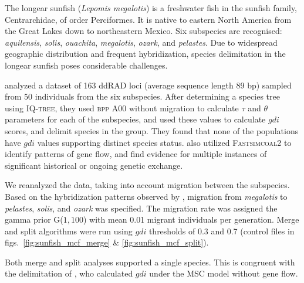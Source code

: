 \documentclass{article1}
\newcommand{\red}[1]{{\color{red}{#1}}}
\newcommand{\blue}[1]{{\color{blue}{#1}}}
\begin{document}
The longear sunfish (\textit{Lepomis megalotis}) is a freshwater fish in the sunfish
family, Centrarchidae, of order Perciformes.  It is native to eastern North America from
the Great Lakes down to northeastern Mexico.  Six subspecies are recognised:
\textit{aquilensis}, \textit{solis}, \textit{ouachita}, \textit{megalotis},
\textit{ozark}, and \textit{pelastes}.  Due to widespread geographic distribution and
frequent hybridization, species delimitation in the longear sunfish poses considerable
challenges.

\citet{Kim2022} analyzed a dataset of 163 ddRAD loci (average sequence length 89 bp)
sampled from 50 individuals from the six subspecies.  After determining a species tree
using \textsc{IQ-tree}, they used \textsc{bpp} A00 without migration to calculate $\tau$
and $\theta$ parameters for each of the subspecies, and used these values to calculate
$gdi$ scores, and delimit species in the group.  They found that none of the
populations have $gdi$ values supporting distinct species status. \citet{Kim2022}
also utilized \textsc{Fastsimcoal2} to identify patterns of gene flow, and find evidence
for multiple instances of significant historical or ongoing genetic exchange.

We reanalyzed the data, taking into account migration between the subspecies.  Based on
the hybridization patterns observed by \cite{Kim2022}, migration from \textit{megalotis}
to \textit{pelastes}, \textit{solis}, and \textit{ozark} was specified.  The migration
rate was assigned the gamma prior G($1,100$) with mean 0.01 migrant individuals per
generation.  Merge and split algorithms were run using $gdi$ thresholds of 0.3 and
0.7 (control files in figs.~\ref{fig:sunfish_mcf_merge} \& \ref{fig:sunfish_mcf_split}).

Both merge and split analyses supported a single species.  This is congruent with the
delimitation of \citet{Kim2022}, who calculated $gdi$ under the MSC model without
gene flow. \red{[look at parameter estimates.]} \blue{Throughout the merge run, which started from 6 species, the migration rates between populations were consistently large, indicating high rates of gene flow between the populations, and further supporting the classification of populations as a single species.}
\end{document}
